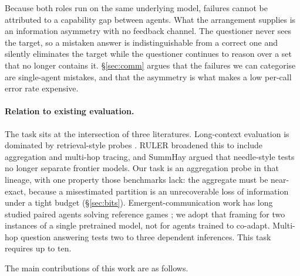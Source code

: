 \documentclass[11pt]{article}
\begin{document}
Because both roles run on the same underlying model, failures cannot be
attributed to a capability gap between agents. What the arrangement supplies is
an information asymmetry with no feedback channel. The questioner never sees the
target, so a mistaken answer is indistinguishable from a correct one and
silently eliminates the target while the questioner continues to reason over a
set that no longer contains it. \S\ref{sec:comm} argues that the failures we can
categorise are single-agent mistakes, and that the asymmetry is what makes a low
per-call error rate expensive.



\paragraph{Relation to existing evaluation.} The task sits at the intersection
of three literatures. Long-context evaluation is dominated by retrieval-style
probes \citep{kamradt2023,liu2024lost}. RULER \citep{hsieh2024} broadened this
to include aggregation and multi-hop tracing, and SummHay \citep{laban2024}
argued that needle-style tests no longer separate frontier models. Our task is
an aggregation probe in that lineage, with one property those benchmarks lack:
the aggregate must be near-exact, because a misestimated partition is an
unrecoverable loss of information under a tight budget (\S\ref{sec:bits}).
Emergent-communication work has long studied paired agents solving reference
games \citep{lewis1969,foerster2016,lazaridou2020,kottur2017}; we adopt that
framing for two instances of a single pretrained model, not for agents trained
to co-adapt. Multi-hop question answering \citep{welbl2018,yang2018hotpotqa}
tests two to three dependent inferences. This task requires up to ten.

The main contributions of this work are as follows.
\end{document}
